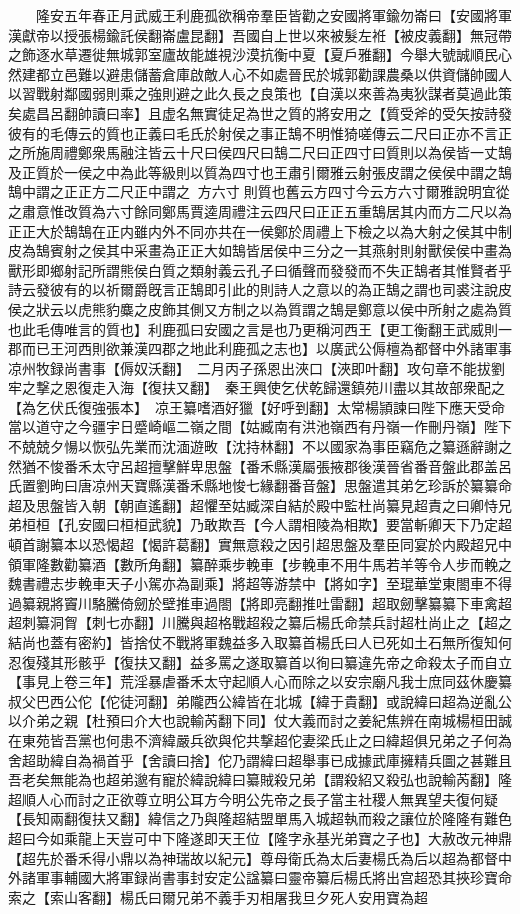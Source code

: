 　　隆安五年春正月武威王利鹿孤欲稱帝羣臣皆勸之安國將軍鍮勿崙曰【安國將軍漢獻帝以授張楊鍮託侯翻崙盧昆翻】吾國自上世以來被髮左袵【被皮義翻】無冠帶之飾逐水草遷徙無城郭室廬故能雄視沙漠抗衡中夏【夏戶雅翻】今舉大號誠順民心然建都立邑難以避患儲蓄倉庫啟敵人心不如處晉民於城郭勸課農桑以供資儲帥國人以習戰射鄰國弱則乘之強則避之此久長之良策也【自漢以來善為夷狄謀者莫過此策矣處昌呂翻帥讀曰率】且虚名無實徒足為世之質的將安用之【質受斧的受矢按詩發彼有的毛傳云的質也正義曰毛氏於射侯之事正鵠不明惟猗嗟傳云二尺曰正亦不言正之所施周禮鄭衆馬融注皆云十尺曰侯四尺曰鵠二尺曰正四寸曰質則以為侯皆一丈鵠及正質於一侯之中為此等級則以質為四寸也王肅引爾雅云射張皮謂之侯侯中謂之鵠鵠中謂之正正方二尺正中謂之方六寸則質也舊云方四寸今云方六寸爾雅說明宜從之肅意惟改質為六寸餘同鄭馬賈逵周禮注云四尺曰正正五重鵠居其内而方二尺以為正正大於鵠鵠在正内雖内外不同亦共在一侯鄭於周禮上下檢之以為大射之侯其中制皮為鵠賓射之侯其中采畫為正正大如鵠皆居侯中三分之一其燕射則射獸侯侯中畫為獸形即鄉射記所謂熊侯白質之類射義云孔子曰循聲而發發而不失正鵠者其惟賢者乎詩云發彼有的以祈爾爵旣言正鵠即引此的則詩人之意以的為正鵠之謂也司裘注說皮侯之狀云以虎熊豹麋之皮飾其側又方制之以為質謂之鵠是鄭意以侯中所射之處為質也此毛傳唯言的質也】利鹿孤曰安國之言是也乃更稱河西王【更工衡翻王武威則一郡而已王河西則欲兼漢四郡之地此利鹿孤之志也】以廣武公傉檀為都督中外諸軍事凉州牧録尚書事【傉奴沃翻】　二月丙子孫恩出浹口【浹即叶翻】攻句章不能拔劉牢之撃之恩復走入海【復扶又翻】　秦王興使乞伏乾歸還鎮苑川盡以其故部衆配之【為乞伏氏復強張本】　凉王纂嗜酒好獵【好呼到翻】太常楊頴諫曰陛下應天受命當以道守之今疆宇日蹙崎嶇二嶺之間【姑臧南有洪池嶺西有丹嶺一作刪丹嶺】陛下不兢兢夕愓以恢弘先業而沈湎遊畋【沈持林翻】不以國家為事臣竊危之纂遜辭謝之然猶不悛番禾太守呂超擅擊鮮卑思盤【番禾縣漢屬張掖郡後漢晉省番音盤此郡盖呂氏置劉昫曰唐凉州天寶縣漢番禾縣地悛七緣翻番音盤】思盤遣其弟乞珍訴於纂纂命超及思盤皆入朝【朝直遙翻】超懼至姑臧深自結於殿中監杜尚纂見超責之曰卿恃兄弟桓桓【孔安國曰桓桓武貌】乃敢欺吾【今人謂相陵為相欺】要當斬卿天下乃定超頓首謝纂本以恐愒超【愒許葛翻】實無意殺之因引超思盤及羣臣同宴於内殿超兄中領軍隆數勸纂酒【數所角翻】纂醉乘步輓車【步輓車不用牛馬若羊等令人步而輓之魏書禮志步輓車天子小駕亦為副乘】將超等游禁中【將如字】至琨華堂東閤車不得過纂親將竇川駱騰倚劒於壁推車過閤【將即亮翻推吐雷翻】超取劒擊纂纂下車禽超超刺纂洞胷【刺七亦翻】川騰與超格戰超殺之纂后楊氏命禁兵討超杜尚止之【超之結尚也蓋有密約】皆捨仗不戰將軍魏益多入取纂首楊氏曰人已死如土石無所復知何忍復殘其形骸乎【復扶又翻】益多罵之遂取纂首以徇曰纂違先帝之命殺太子而自立【事見上卷三年】荒淫暴虐番禾太守起順人心而除之以安宗廟凡我士庶同茲休慶纂叔父巴西公佗【佗徒河翻】弟隴西公緯皆在北城【緯于貴翻】或說緯曰超為逆亂公以介弟之親【杜預曰介大也說輸芮翻下同】仗大義而討之姜紀焦辨在南城楊桓田誠在東苑皆吾黨也何患不濟緯嚴兵欲與佗共撃超佗妻梁氏止之曰緯超俱兄弟之子何為舍超助緯自為禍首乎【舍讀曰捨】佗乃謂緯曰超舉事已成據武庫擁精兵圖之甚難且吾老矣無能為也超弟邈有寵於緯說緯曰纂賊殺兄弟【謂殺紹又殺弘也說輸芮翻】隆超順人心而討之正欲尊立明公耳方今明公先帝之長子當主社稷人無異望夫復何疑【長知兩翻復扶又翻】緯信之乃與隆超結盟單馬入城超執而殺之讓位於隆隆有難色超曰今如乘龍上天豈可中下隆遂即天王位【隆字永基光弟寶之子也】大赦改元神鼎【超先於番禾得小鼎以為神瑞故以紀元】尊母衛氏為太后妻楊氏為后以超為都督中外諸軍事輔國大將軍録尚書事封安定公諡纂曰靈帝纂后楊氏將出宫超恐其挾珍寶命索之【索山客翻】楊氏曰爾兄弟不義手刃相屠我旦夕死人安用寶為超